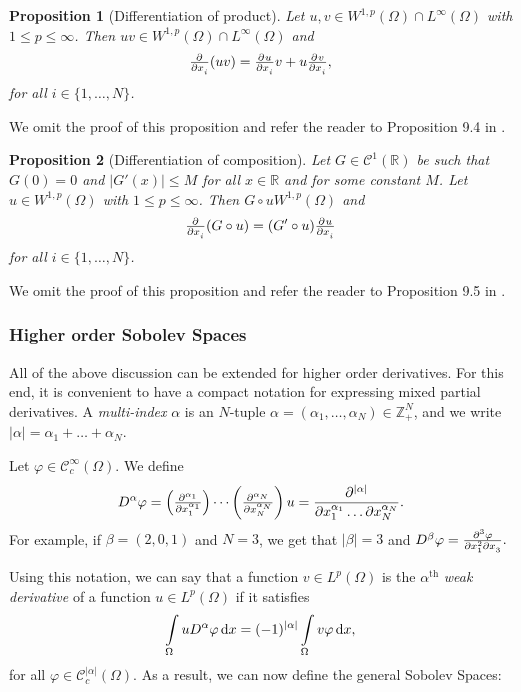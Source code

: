 \documentclass[a4paper,doc,11pt]{article}
\newtheorem{proposition}{Proposition}[theorem]
\newcommand{\R}{\mathbb{R}}
\newcommand{\Z}{\mathbb{Z}}
\newcommand{\CC}{\mathcal{C}}
\begin{document}
\begin{proposition}[Differentiation of product]
    Let \(u,v \in W^{1,p} (\Omega) \cap L^\infty (\Omega)\) with \( 1\leq p \leq \infty\). Then \(uv \in W^{1,p} (\Omega) \cap L^{\infty} (\Omega)\) and
    \[
        \pd{ }{x_i} (uv) = \pd{u}{x_i} v + u \pd{v}{x_i},
    \]
    for all \( i \in \{1,\ldots, N\}\).
\end{proposition}

We omit the proof of this proposition and refer the reader to Proposition 9.4 in \citep{Brezis2010}.

\begin{proposition}[Differentiation of composition]
    Let \(G \in \CC^1(\R)\) be such that \( G(0) = 0\) and \( |G'(x)| \leq M  \) for all \( x\in \R\) and for some constant \(M\). Let \( u\in W^{1,p} (\Omega)\) with \( 1\leq p \leq \infty\). Then \(G \circ u W^{1,p}(\Omega)\) and
    \[
        \pd{ }{x_i} (G \circ u) = (G'\circ u) \pd{u}{x_i}
    \]
    for all \( i \in \{1,\ldots, N\}\).
\end{proposition}

We omit the proof of this proposition and refer the reader to Proposition 9.5 in \citep{Brezis2010}.

\subsubsection{Higher order Sobolev Spaces}

All of the above discussion can be extended for higher order derivatives. For this end, it is convenient to have a compact notation for expressing mixed partial derivatives. A \emph{multi-index} \(\alpha\) is an \(N\)-tuple \( \alpha = (\alpha_1, \ldots, \alpha_N) \in \Z^N_+\), and we write \(|\alpha| = \alpha_1 + \ldots + \alpha_N\). 

Let \( \varphi \in \CC_c^\infty (\Omega)\). We define 
\[
    D^\alpha \varphi = \left( \pd[\alpha_1]{ }{x_1} \right) \cdots \left( \pd[\alpha_N]{ }{x_N} \right) u = \frac{\partial^{|\alpha|}}{ \partial x_1^{\alpha_1} \ldots \partial x_N^{\alpha_N} }.
\]
For example, if \(\beta = (2,0,1)\) and \(N = 3\), we get that \( |\beta| = 3\) and
\(
    D^\beta \varphi = \md{\varphi}{3}{x_1}{2}{x_3}{}.
\)

Using this notation, we can say that a function \( v \in L^{p}(\Omega)\) is the \( \alpha^\text{th}\) \emph{weak derivative} of a function \(u \in L^p(\Omega)\) if it satisfies
\[
    \int\limits_\Omega u D^\alpha \varphi \dif x = (-1)^{|\alpha|} \int\limits_\Omega v \varphi \dif x,
\]
for all \(\varphi \in \CC_c^{|\alpha|} (\Omega)\). As a result, we can now define the general Sobolev Spaces:
\end{document}
